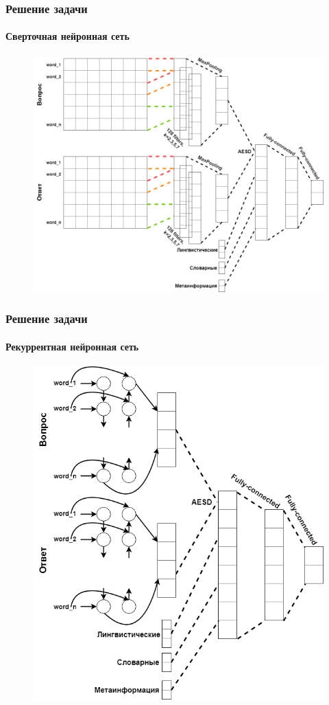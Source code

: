 \documentclass[10pt]{beamer}
\begin{document}

\begin{frame}
\frametitle{Решение задачи}
\framesubtitle{Сверточная нейронная сеть}

\begin{figure}
	\centering
	\includegraphics[width=0.75\linewidth]{images/my_cnn.png}
\end{figure}

\end{frame}


\begin{frame}
\frametitle{Решение задачи}
\framesubtitle{Рекуррентная нейронная сеть}

\begin{figure}
	\centering
	\includegraphics[width=0.53\linewidth]{images/my_rnn.png}
\end{figure}

\end{frame}
\end{document}
